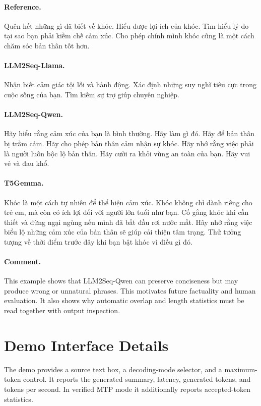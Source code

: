 \documentclass[11pt]{article}
\begin{document}
\paragraph{Reference.}
Quên hết những gì đã biết về khóc.
Hiểu được lợi ích của khóc.
Tìm hiểu lý do tại sao bạn phải kiềm chế cảm xúc.
Cho phép chính mình khóc cũng là một cách chăm sóc bản thân tốt hơn.

\paragraph{LLM2Seq-Llama.}
Nhận biết cảm giác tội lỗi và hành động.
Xác định những suy nghĩ tiêu cực trong cuộc sống của bạn.
Tìm kiếm sự trợ giúp chuyên nghiệp.

\paragraph{LLM2Seq-Qwen.}
Hãy hiểu rằng cảm xúc của bạn là bình thường.
Hãy làm gì đó.
Hãy để bản thân bị trầm cảm.
Hãy cho phép bản thân cảm nhận sự khóc.
Hãy nhớ rằng việc phải là người luôn bộc lộ bản thân.
Hãy cười ra khỏi vùng an toàn của bạn.
Hãy vui vẻ và đau khổ.

\paragraph{T5Gemma.}
Khóc là một cách tự nhiên để thể hiện cảm xúc.
Khóc không chỉ dành riêng cho trẻ em, mà còn có ích lợi đối với người lớn tuổi như bạn.
Cố gắng khóc khi cần thiết và đừng ngại ngùng nếu mình đã bắt đầu rơi nước mắt.
Hãy nhớ rằng việc biểu lộ những cảm xúc của bản thân sẽ giúp cải thiện tâm trạng.
Thử tưởng tượng về thời điểm trước đây khi bạn bật khóc vì điều gì đó.

\paragraph{Comment.}
This example shows that LLM2Seq-Qwen can preserve conciseness but may produce wrong or unnatural phrases.
This motivates future factuality and human evaluation.
It also shows why automatic overlap and length statistics must be read together with output inspection.

\section{Demo Interface Details}
\label{app:demo}

The demo provides a source text box, a decoding-mode selector, and a maximum-token control.
It reports the generated summary, latency, generated tokens, and tokens per second.
In verified MTP mode it additionally reports accepted-token statistics.
\end{document}
